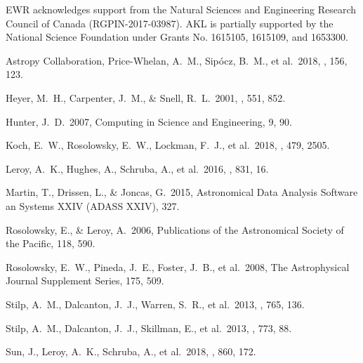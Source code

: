 \documentclass{rnaastex}
\begin{document}
\acknowledgments

EWR acknowledges support from the Natural Sciences and Engineering Research Council of Canada (RGPIN-2017-03987). AKL is partially supported by the National Science Foundation under Grants No. 1615105, 1615109, and 1653300.


\begin{thebibliography}{}

 Astropy Collaboration, Price-Whelan, A.~M., Sip{\'{o}}cz, B.~M., et al.\ 2018, \aj, 156, 123.

 Heyer, M.~H., Carpenter, J.~M., \& Snell, R.~L.\ 2001, \apj, 551, 852.

 Hunter, J.~D.\ 2007, Computing in Science and Engineering, 9, 90.

 Koch, E.~W., Rosolowsky, E.~W., Lockman, F.~J., et al.\ 2018, \mnras, 479, 2505.

 Leroy, A.~K., Hughes, A., Schruba, A., et al.\ 2016, \apj, 831, 16.

 Martin, T., Drissen, L., \& Joncas, G.\ 2015, Astronomical Data Analysis Software an Systems XXIV (ADASS XXIV), 327.

 Rosolowsky, E., \& Leroy, A.\ 2006, Publications of the Astronomical Society of the Pacific, 118, 590.

 Rosolowsky, E.~W., Pineda, J.~E., Foster, J.~B., et al.\ 2008, The Astrophysical Journal Supplement Series, 175, 509.

 Stilp, A.~M., Dalcanton, J.~J., Warren, S.~R., et al.\ 2013, \apj, 765, 136.

 Stilp, A.~M., Dalcanton, J.~J., Skillman, E., et al.\ 2013, \apj, 773, 88.

 Sun, J., Leroy, A.~K., Schruba, A., et al.\ 2018, \apj, 860, 172.


\end{thebibliography}
\end{document}
